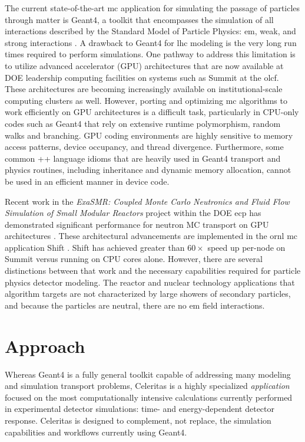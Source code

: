\documentclass[10pt]{article}
\begin{document}
The current state-of-the-art \ac{mc} application for simulating the passage of
particles through matter is Geant4, a toolkit that encompasses the simulation of
all interactions described by the Standard Model of Particle Physics: \ac{em},
weak, and strong interactions \cite{geant4}. A drawback to Geant4 for \ac{lhc}
modeling is the very long run times required to perform simulations. One pathway
to address this limitation is to utilize advanced accelerator (GPU)
architectures that are now available at DOE leadership computing facilities on
systems such as Summit at the \ac{olcf}. These architectures are becoming
increasingly available on institutional-scale computing clusters as well.
However, porting and optimizing \ac{mc} algorithms to work efficiently on GPU
architectures is a difficult task, particularly in CPU-only codes such as Geant4
that rely on extensive runtime polymorphism, random walks and branching. GPU
coding environments are highly sensitive to memory access patterns, device
occupancy, and thread divergence. Furthermore, some common \C++ language idioms
that are heavily used in Geant4 transport and physics routines, including
inheritance and dynamic memory allocation, cannot be used in an efficient manner
in device code.

Recent work in the \emph{ExaSMR: Coupled Monte Carlo Neutronics and Fluid Flow
Simulation of Small Modular Reactors} project within the DOE \ac{ecp}
\cite{ecp2019} has demonstrated significant performance for neutron MC transport
on GPU architectures \cite{hamilton_continuous-energy_2019}. These architectural
advancements are implemented in the \ac{ornl} \ac{mc} application Shift
\cite{pandya_implementation_2016}. Shift has achieved greater than $60\times$
speed up per-node on Summit versus running on CPU cores alone. However, there
are several distinctions between that work and the necessary capabilities
required for particle physics detector modeling. The reactor and nuclear
technology applications that algorithm targets are not characterized by large
showers of secondary particles, and because the particles are neutral, there are
no \ac{em} field interactions.

\section*{Approach}

Whereas Geant4 is a fully general toolkit capable of addressing many modeling
and simulation transport problems,  Celeritas is a highly specialized
\emph{application} focused on the most computationally intensive calculations
currently performed in experimental detector simulations: time- and
energy-dependent detector response. Celeritas is designed to complement, not
replace, the simulation capabilities and workflows currently using Geant4.
\end{document}
